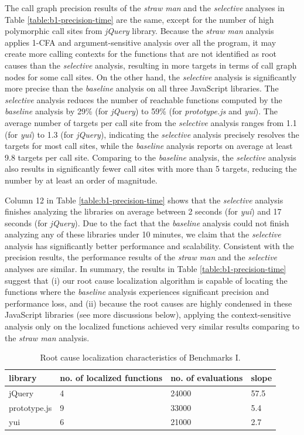 The call graph precision results of the {\it straw man} and the {\it selective} analyses in Table \ref{table:b1-precision-time} are the same, except for the number of high polymorphic call sites from {\it jQuery} library. Because the {\it straw man} analysis applies 1-CFA and argument-sensitive analysis over all the program, it may create more calling contexts for the functions that are not identified as root causes than the {\it selective} analysis, resulting in more targets in terms of call graph nodes for some call sites. On the other hand, the {\it selective} analysis is significantly more precise than the {\it baseline} analysis on all three JavaScript libraries. The {\it selective} analysis reduces the number of reachable functions computed by the {\it baseline} analysis by 29\% (for {\it jQuery}) to 59\% (for {\it prototype.js} and {\it yui}). The average number of targets per call site from the {\it selective} analysis ranges from 1.1 (for {\it yui}) to 1.3 (for {\it jQuery}), indicating the {\it selective} analysis precisely resolves the targets for most call sites, while the {\it baseline} analysis reports on average at least 9.8 targets per call site. Comparing to the {\it baseline} analysis, the {\it selective} analysis also results in significantly fewer call sites with more than 5 targets, reducing the number by at least an order of magnitude.

Column 12 in Table \ref{table:b1-precision-time} shows that the {\it selective} analysis finishes analyzing the libraries on average between 2 seconds (for {\it yui}) and 17 seconds (for {\it jQuery}). Due to the fact that the {\it baseline} analysis could not finish analyzing any of these libraries under 10 minutes, we claim that the {\it selective} analysis has significantly better performance and scalability. Consistent with the precision results, the performance results of the {\it straw man} and the {\it selective} analyses are similar. In summary, the results in Table \ref{table:b1-precision-time} suggest that (i) our root cause localization algorithm is capable of locating the functions where the {\it baseline} analysis experiences significant precision and performance loss, and (ii) because the root causes are highly condensed in these JavaScript libraries (see more discussions below), applying the context-sensitive analysis only on the localized functions achieved very similar results comparing to the {\it straw man} analysis.

\begin{table}[h!]
\centering
\begin{tabular}{ | C{0.67in} | C{0.6in} | C{0.72in} | C{0.6in} |}
\hline
 {\bf library} & {\bf no. of localized functions} & {\bf no. of evaluations} &  {\bf slope} \\
 \hline
jQuery & 4 & 24000 & 57.5 \\
 \hline
 prototype.js & 9 & 33000 & 5.4 \\
 \hline
 yui & 6 & 21000 & 2.7 \\
 \hline
 \end{tabular}
\caption{\textmd{Root cause localization characteristics of Benchmarks I.}}
\vspace{-6pt}
\label{table:b1-characteristics}
\end{table}

